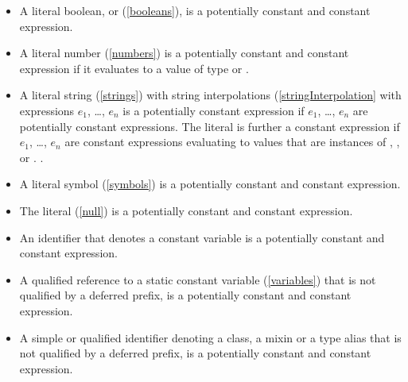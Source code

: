 \documentclass[makeidx]{article}
\begin{document}
\begin{itemize}
\item A literal boolean, \TRUE{} or \FALSE{} (\ref{booleans}), is a potentially constant and constant expression.

\item A literal number (\ref{numbers}) is a potentially constant and constant expression if it evaluates to a value of type  or .

\item A literal string (\ref{strings}) with string interpolations (\ref{stringInterpolation} with expressions $e_1$, \ldots{}, $e_n$ is a potentially constant expression if $e_1$, \ldots{}, $e_n$ are potentially constant expressions.
The literal is further a constant expression if $e_1$, \ldots{}, $e_n$ are constant expressions evaluating to values that are instances of ,  ,  or .
.

\item A literal symbol (\ref{symbols}) is a potentially constant and constant expression.

\item The literal \NULL{} (\ref{null}) is a potentially constant and constant expression.

\item An identifier that denotes a constant variable is a potentially constant and constant expression.

\item A qualified reference to a static constant variable (\ref{variables}) that is not qualified by a deferred prefix, is a potentially constant and constant expression.

\item A simple or qualified identifier denoting a class, a mixin or a type alias that is not qualified by a deferred prefix, is a potentially constant and constant expression.


\end{itemize}
\end{document}
